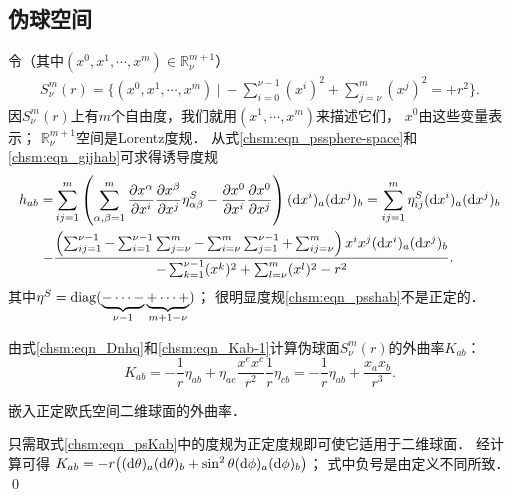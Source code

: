 
\subsection{伪球空间}\label{chsm:sec_pseudo-sphere}
令（其中$(x^0,x^1,\cdots,x^{m})\in \mathbb{R}^{m+1}_\nu$）
\begin{align}
    S^m_{\nu}(r) =  \bigl\{(x^0,x^1,\cdots,x^{m})\ |\  
    -\sum_{i=0}^{\nu-1} (x^i)^2+\sum_{j=\nu}^{m} (x^j)^2 = +r^2 \bigr\} . 
    \label{chsm:eqn_pssphere-space} 
\end{align} 
因$S^m_{\nu}(r)$上有$m$个自由度，我们就用$(x^1,\cdots,x^{m})$来描述它们，
$x^0$由这些变量表示；
$\mathbb{R}^{m+1}_\nu$空间是Lorentz度规．
从式\eqref{chsm:eqn_pssphere-space}和\eqref{chsm:eqn_gijhab}可求得诱导度规
\begin{align}
    h_{ab}=& \sum_{ij=1}^{m}\left(\sum_{\alpha,\beta=1}^{m}\frac{\partial x^\alpha}{\partial x^i}
    \frac{\partial x^\beta}{\partial x^j}\eta^S_{\alpha\beta} 
    -\frac{\partial x^0}{\partial x^i}  \frac{\partial x^0}{\partial x^j} \right) 
     ({\rm d} x^i)_a ({\rm d} x^j)_b  
    = \sum_{ij=1}^{m} \eta^S_{ij} ({\rm d} x^i)_a ({\rm d} x^j)_b  \notag \\
    -&\frac{ \left(\sum_{ij=1}^{\nu-1} - \sum_{i=1}^{\nu-1}\sum_{j=\nu}^{m}
     -\sum_{i=\nu}^{m}\sum_{j=1}^{\nu-1} +\sum_{ij=\nu}^{m} \right)
     x^i x^j({\rm d} x^i)_a ({\rm d} x^j)_b }
    {-\sum_{k=1}^{\nu-1}(x^k)^2+\sum_{l=\nu}^{m}(x^l)^2-r^2}  . \label{chsm:eqn_psshab}
\end{align}  %
其中$\eta^S={\rm diag}(\underbrace{-\cdots-}_{\nu-1} \underbrace{+\cdots+}_{m+1-\nu})$；
很明显度规\eqref{chsm:eqn_psshab}不是正定的．

由式\eqref{chsm:eqn_Dnhq}和\eqref{chsm:eqn_Kab-1}计算伪球面$S^m_{\nu}(r)$的外曲率$K_{ab}$：
\begin{equation}\label{chsm:eqn_psKab}
    K_{ab} %
    =-\frac{1}{r}\eta_{ab}+
     \eta_{ae} \frac{x^e x^c}{r^2}  \frac{1}{r}\eta_{cb}
    =-\frac{1}{r}\eta_{ab}+ \frac{x_a x_b}{r^3} .
\end{equation}

\begin{example}
    嵌入正定欧氏空间二维球面的外曲率．
\end{example}
只需取式\eqref{chsm:eqn_psKab}中的度规为正定度规即可使它适用于二维球面．
经计算可得
$K_{ab}=-r\bigl(({\rm d}\theta)_a ({\rm d}\theta)_b + \sin^2\theta
({\rm d}\phi)_a({\rm d}\phi)_b\bigr)$；
式中负号是由定义不同所致．
\qed

